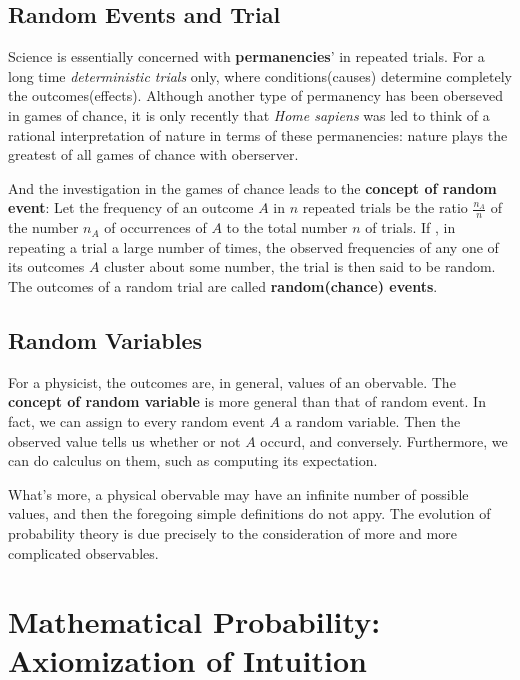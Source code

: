 \documentclass[a4paper]{book}
\begin{document}
    \subsection{Random Events and Trial}

    Science is essentially concerned with  \textbf{permanencies}' in repeated
    trials.  For a long time \textit{deterministic trials} only, where
    conditions(causes) determine completely the outcomes(effects).
    Although another type of permanency has been oberseved in games of
    chance, it is only recently that \textit{Home sapiens} was led to
    think of a rational interpretation of nature in terms of these
    permanencies: nature plays the greatest of all games of chance with
    oberserver.\cite{1977probability}

    And the investigation in the games of chance leads to the \textbf{concept of
    random event}: Let the frequency of an outcome $A$ in $n$ repeated
    trials be the ratio $\frac{n_A}{n}$ of the number $n_A$ of
    occurrences of $A$ to the total number $n$ of trials. If , in
    repeating a trial a large number of times, the observed frequencies
    of any one of its outcomes $A$ cluster about some number, the trial
    is then said to be random. The outcomes of a random trial are called
    \textbf{random(chance) events}.\cite{1977probability}

    \subsection{Random Variables}

    For a physicist, the outcomes are, in general, values of an
    obervable.  The \textbf{concept of random variable} is more general
    than that of random event.  In fact, we can assign to every random
    event $A$ a random variable. Then the observed value tells us
    whether or not $A$ occurd, and conversely.  Furthermore, we can do
    calculus on them, such as computing its
    expectation.\cite{1977probability}

    What's more, a physical obervable may have an infinite number of
    possible values, and then the foregoing simple definitions do not
    appy.  The evolution of probability theory is due precisely to the
    consideration of more and more complicated
    observables.\cite{1977probability}

  \section{Mathematical Probability: Axiomization of Intuition}
\end{document}
